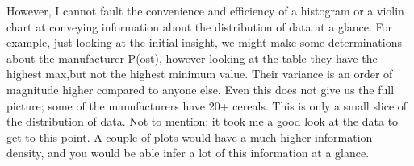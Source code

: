 \documentclass{article}
\begin{document}
However, I cannot fault the convenience and efficiency of a histogram or a violin chart at conveying 
information about the distribution of data at a glance. For example, just looking at the initial insight, we might make some determinations about the manufacturer P(ost), however looking at the table they have the highest max,but not the highest minimum value. Their variance is an order of magnitude higher compared to anyone else.
Even this does not give us the full picture; some of the manufacturers have 20+ cereals. This is only a small slice of the distribution of data. Not to mention; it took me a good look at the data to get to this point. A couple of plots would have a much higher information density, and you would be able infer a lot of this information at a glance.



\end{document}
